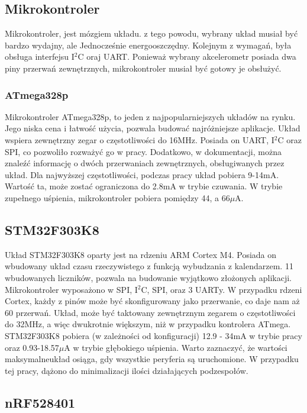 \subsection{Mikrokontroler}
Mikrokontroler, jest mózgiem układu. z tego powodu, wybrany układ musiał być bardzo wydajny, ale Jednocześnie energooszczędny. Kolejnym z wymagań, była obsługa interfejsu I$^{2}$C oraj UART. Ponieważ wybrany akcelerometr posiada dwa piny przerwań zewnętrznych, mikrokontroler musiał być gotowy je obsłużyć.

\subsubsection{ATmega328p}
Mikrokontroler ATmega328p, to jeden z najpopularniejszych układów na rynku. Jego niska cena i łatwość użycia, pozwala budować najróżniejsze aplikacje. Układ wspiera zewnętrzny zegar o częstotliwości do 16MHz. Posiada on UART, I$^{2}$C oraz SPI, co pozwoliło rozważyć go w pracy. Dodatkowo, w dokumentacji, można znaleźć informację o dwóch przerwaniach zewnętrznych, obsługiwanych przez układ.\cite{ATMEGA328P} Dla najwyższej częstotliwości, podczas pracy układ pobiera 9-14mA. Wartość ta, może zostać ograniczona do 2.8mA w trybie czuwania. W trybie zupełnego uśpienia, mikrokontroler pobiera pomiędzy 44, a 66$\mu$A.

\subsection{STM32F303K8}
Układ STM32F303K8 oparty jest na rdzeniu ARM Cortex M4. Posiada on wbudowany układ czasu rzeczywistego z funkcją wybudzania z kalendarzem. 11 wbudowanych liczników, pozwala na budowanie wyjątkowo złożonych aplikacji. Mikrokontroler wyposażono w SPI, I$^{2}$C, SPI, oraz 3 UARTy. W przypadku rdzeni Cortex, każdy z pinów może być skonfigurowany jako przerwanie, co daje nam aż 60 przerwań. \cite{STM32F303K8} Układ, może być taktowany zewnętrznym zegarem o częstotliwości do 32MHz, a więc dwukrotnie większym, niż w przypadku kontrolera ATmega. STM32F303K8 pobiera (w zależności od konfiguracji) 12.9 - 34mA w trybie pracy oraz 0.93-18.57$\mu$A w trybie głębokiego uśpienia. Warto zaznaczyć, że wartości maksymalneukład osiąga, gdy wszystkie peryferia są uruchomione. W przypadku tej pracy, dążono do minimalizacji ilości działających podzespołów.

\subsection{nRF528401}

